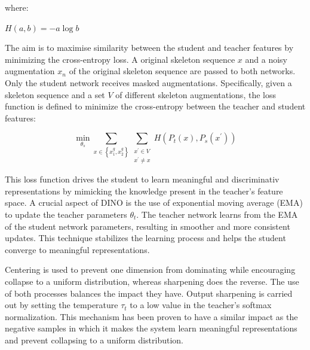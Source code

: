 where:

\begin{center}
$H(a, b)=-a \log b$
\end{center}

The aim is to maximise similarity between the student and teacher features by minimizing the cross-entropy loss. A original skeleton sequence $x$ and a noisy augmentation $x_n$ of the original skeleton sequence are passed to both networks. Only the student network receives masked augmentations. Specifically, given a skeleton sequence and a set $V$ of different skeleton augmentations, the loss function is defined to minimize the cross-entropy between the teacher and student features:

$$
\min _{\theta_s} \sum_{x \in\left\{x_1^g, x_2^g\right\}} \sum_{\substack{x^{\prime} \in V \\ x^{\prime} \neq x}} H\left(P_t(x), P_s\left(x^{\prime}\right)\right)
$$

This loss function drives the student to learn meaningful and discriminativ representations by mimicking the knowledge present in the teacher's feature space. A crucial aspect of DINO is the use of exponential moving average (EMA) to update the teacher parameters $\theta_t$. The teacher network learns from the EMA of the student network parameters, resulting in smoother and more consistent updates. This technique stabilizes the learning process and helps the student converge to meaningful representations. 


Centering \cite{caron2021emerging} is used to prevent one dimension from dominating while encouraging collapse to a uniform distribution, whereas sharpening \cite{caron2021emerging} does the reverse. The use of both processes balances the impact they have. Output sharpening is carried out by setting the temperature $\tau_t$ to a low value in the teacher's softmax normalization. 
This mechanism has been proven to have a similar impact as the negative samples \cite{caron2021emerging} in which it makes the system learn meaningful representations and prevent collapsing to a uniform distribution. 

